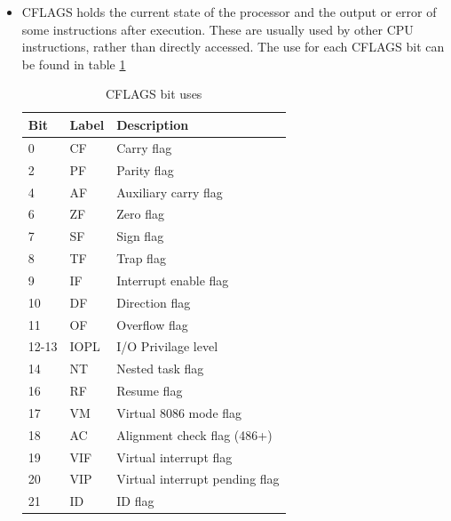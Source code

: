\documentclass[a4paper,11pt]{report}
\begin{document}
\begin{itemize}
\begin{itemize}
						\end{itemize}
					\item CFLAGS holds the current state of the processor and the output or error of some instructions after execution. 
						These are usually used by other CPU instructions, rather than directly accessed.
						The use for each CFLAGS bit can be found in table \ref{tab:CFLAGSBits} 
						\begin{table}[htb]
							\centering
							\begin{tabular}{| l | l | l |}
								\hline
								\textbf{Bit} &  \textbf{Label} &   \textbf{Description} \\\hline 
								0   &   CF &     Carry flag \\ \hline
								2   &   PF   &   Parity flag \\ \hline
								4   &   AF   &   Auxiliary carry flag \\ \hline
								6   &   ZF   &   Zero flag \\ \hline
								7   &   SF   &   Sign flag \\ \hline
								8   &   TF   &   Trap flag \\ \hline
								9   &   IF   &   Interrupt enable flag \\ \hline
								10  &   DF   &   Direction flag \\ \hline
								11  &   OF   &   Overflow flag \\ \hline
								12-13 & IOPL &   I/O Privilage level \\ \hline
								14  &   NT   &   Nested task flag \\ \hline
								16  &   RF   &   Resume flag \\ \hline
								17  &   VM   &   Virtual 8086 mode flag \\ \hline
								18  &   AC   &   Alignment check flag (486+) \\ \hline
								19  &   VIF  &   Virtual interrupt flag \\ \hline
								20  &   VIP  &   Virtual interrupt pending flag \\ \hline
								21  &   ID   &   ID flag \\ \hline
						\end{tabular}
						\caption{CFLAGS bit uses}
						\label{tab:CFLAGSBits}
					\end{table}
				\end{itemize}
				
\end{document}
